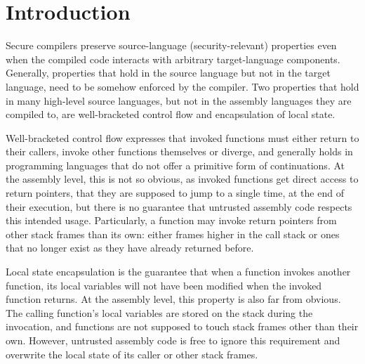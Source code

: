 \documentclass[sigplan,screen]{acmart}
\begin{document}





\maketitle

\section{Introduction}
Secure compilers preserve source-language (security-relevant) properties even when the compiled code interacts with arbitrary target-language components.
Generally, properties that hold in the source language but not in the target language, need to be somehow enforced by the compiler.
Two properties that hold in many high-level source languages, but not in the assembly languages they are compiled to, are well-bracketed control flow and encapsulation of local state.

Well-bracketed control flow expresses that invoked functions must either return to their callers, invoke other functions themselves or diverge, and generally holds in programming languages that do not offer a primitive form of continuations. 
At the assembly level, this is not so obvious, as invoked functions get direct access to return pointers, that they are supposed to jump to a single time, at the end of their execution, but there is no guarantee that untrusted assembly code respects this intended usage.
Particularly, a function may invoke return pointers from other stack frames than its own: either frames higher in the call stack or ones that no longer exist as they have already returned before. 

Local state encapsulation is the guarantee that when a function invokes another function, its local variables will not have been modified when the invoked function returns.
At the assembly level, this property is also far from obvious.
The calling function's local variables are stored on the stack during the invocation, and functions are not supposed to touch stack frames other than their own.
However, untrusted assembly code is free to ignore this requirement and overwrite the local state of its caller or other stack frames.
\end{document}
